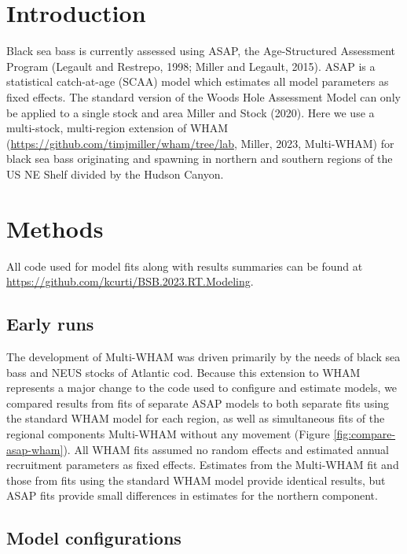 \documentclass[
]{article}
\begin{document}
\pagebreak

\hypertarget{introduction}{%
\section{Introduction}\label{introduction}}

Black sea bass is currently assessed using ASAP, the Age-Structured Assessment Program (Legault and Restrepo, 1998; Miller and Legault, 2015). ASAP is a statistical catch-at-age (SCAA) model which estimates all model parameters as fixed effects. The standard version of the Woods Hole Assessment Model can only be applied to a single stock and area Miller and Stock (2020). Here we use a multi-stock, multi-region extension of WHAM (\url{https://github.com/timjmiller/wham/tree/lab}, Miller, 2023, Multi-WHAM) for black sea bass originating and spawning in northern and southern regions of the US NE Shelf divided by the Hudson Canyon.

\hypertarget{methods}{%
\section{Methods}\label{methods}}

All code used for model fits along with results summaries can be found at \url{https://github.com/kcurti/BSB.2023.RT.Modeling}.

\hypertarget{early-runs}{%
\subsection{Early runs}\label{early-runs}}

The development of Multi-WHAM was driven primarily by the needs of black sea bass and NEUS stocks of Atlantic cod. Because this extension to WHAM represents a major change to the code used to configure and estimate models, we compared results from fits of separate ASAP models to both separate fits using the standard WHAM model for each region, as well as simultaneous fits of the regional components Multi-WHAM without any movement (Figure \ref{fig:compare-asap-wham}). All WHAM fits assumed no random effects and estimated annual recruitment parameters as fixed effects. Estimates from the Multi-WHAM fit and those from fits using the standard WHAM model provide identical results, but ASAP fits provide small differences in estimates for the northern component.

\hypertarget{model-configurations}{%
\subsection{Model configurations}\label{model-configurations}}
\end{document}

